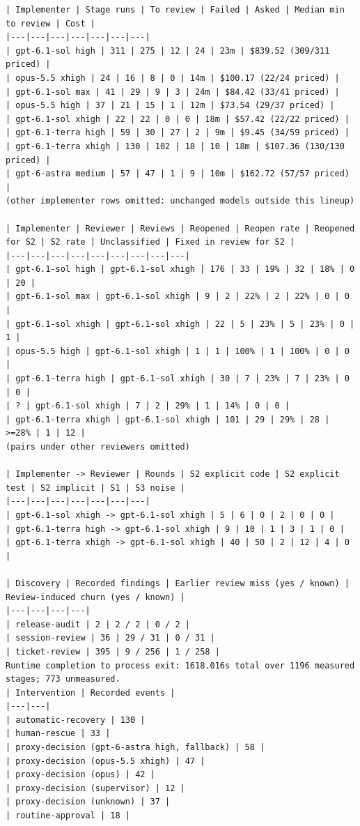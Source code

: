 \documentclass[11pt,a4paper]{article}
\begin{document}
{\tiny
\begin{verbatim}
| Implementer | Stage runs | To review | Failed | Asked | Median min to review | Cost |
|---|---|---|---|---|---|---|
| gpt-6.1-sol high | 311 | 275 | 12 | 24 | 23m | $839.52 (309/311 priced) |
| opus-5.5 xhigh | 24 | 16 | 8 | 0 | 14m | $100.17 (22/24 priced) |
| gpt-6.1-sol max | 41 | 29 | 9 | 3 | 24m | $84.42 (33/41 priced) |
| opus-5.5 high | 37 | 21 | 15 | 1 | 12m | $73.54 (29/37 priced) |
| gpt-6.1-sol xhigh | 22 | 22 | 0 | 0 | 18m | $57.42 (22/22 priced) |
| gpt-6.1-terra high | 59 | 30 | 27 | 2 | 9m | $9.45 (34/59 priced) |
| gpt-6.1-terra xhigh | 130 | 102 | 18 | 10 | 18m | $107.36 (130/130 priced) |
| gpt-6-astra medium | 57 | 47 | 1 | 9 | 10m | $162.72 (57/57 priced) |
(other implementer rows omitted: unchanged models outside this lineup)

| Implementer | Reviewer | Reviews | Reopened | Reopen rate | Reopened for S2 | S2 rate | Unclassified | Fixed in review for S2 |
|---|---|---|---|---|---|---|---|---|
| gpt-6.1-sol high | gpt-6.1-sol xhigh | 176 | 33 | 19% | 32 | 18% | 0 | 20 |
| gpt-6.1-sol max | gpt-6.1-sol xhigh | 9 | 2 | 22% | 2 | 22% | 0 | 0 |
| gpt-6.1-sol xhigh | gpt-6.1-sol xhigh | 22 | 5 | 23% | 5 | 23% | 0 | 1 |
| opus-5.5 high | gpt-6.1-sol xhigh | 1 | 1 | 100% | 1 | 100% | 0 | 0 |
| gpt-6.1-terra high | gpt-6.1-sol xhigh | 30 | 7 | 23% | 7 | 23% | 0 | 0 |
| ? | gpt-6.1-sol xhigh | 7 | 2 | 29% | 1 | 14% | 0 | 0 |
| gpt-6.1-terra xhigh | gpt-6.1-sol xhigh | 101 | 29 | 29% | 28 | >=28% | 1 | 12 |
(pairs under other reviewers omitted)

| Implementer -> Reviewer | Rounds | S2 explicit code | S2 explicit test | S2 implicit | S1 | S3 noise |
|---|---|---|---|---|---|---|
| gpt-6.1-sol xhigh -> gpt-6.1-sol xhigh | 5 | 6 | 0 | 2 | 0 | 0 |
| gpt-6.1-terra high -> gpt-6.1-sol xhigh | 9 | 10 | 1 | 3 | 1 | 0 |
| gpt-6.1-terra xhigh -> gpt-6.1-sol xhigh | 40 | 50 | 2 | 12 | 4 | 0 |

| Discovery | Recorded findings | Earlier review miss (yes / known) | Review-induced churn (yes / known) |
|---|---|---|---|
| release-audit | 2 | 2 / 2 | 0 / 2 |
| session-review | 36 | 29 / 31 | 0 / 31 |
| ticket-review | 395 | 9 / 256 | 1 / 258 |
Runtime completion to process exit: 1618.016s total over 1196 measured stages; 773 unmeasured.
| Intervention | Recorded events |
|---|---|
| automatic-recovery | 130 |
| human-rescue | 33 |
| proxy-decision (gpt-6-astra high, fallback) | 58 |
| proxy-decision (opus-5.5 xhigh) | 47 |
| proxy-decision (opus) | 42 |
| proxy-decision (supervisor) | 12 |
| proxy-decision (unknown) | 37 |
| routine-approval | 18 |
\end{verbatim}
}
\end{document}
